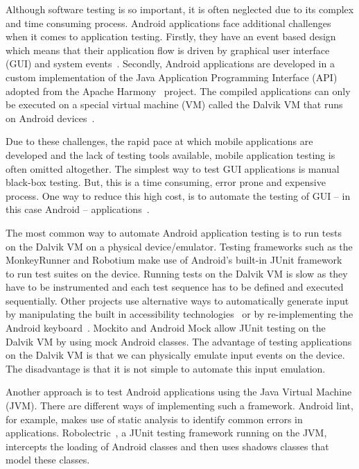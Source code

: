 \documentclass{acm_proc_article-sp}
\begin{document}
Although software testing is so important, it is often neglected due to its complex and time consuming process. Android
applications face additional challenges when it comes to application testing. Firstly, they have an event based design which means that
their application flow is driven by graphical user interface (GUI) and system events~\cite{Hu:2011}. Secondly, Android applications are
developed in a
custom implementation of the Java Application Programming Interface (API)  adopted from the Apache Harmony~\cite{harmony} project. The
compiled applications can only be executed on a special virtual machine (VM) called the Dalvik VM that runs on Android
devices~\cite{dalvik}.

Due to these challenges, the rapid pace at which mobile applications are developed and the lack of testing tools available, mobile
application testing is often omitted altogether. The simplest way to test GUI applications is manual black-box testing.
But, this is a time consuming, error prone and expensive~\cite{AccessibilityTech} process. One way to reduce this high cost, is to  automate
the testing of GUI -- in this case Android -- applications~\cite{AccessibilityTech}.

The most common way to automate Android application testing is to run tests on the Dalvik VM on a
physical device/emulator. Testing frameworks such as the MonkeyRunner and Robotium make use of Android's built-in JUnit
framework~\cite{TestingAndroid} to run test suites on the device. Running tests on the Dalvik VM is slow as they have to be instrumented and
each test sequence has to be defined and executed sequentially. Other projects use alternative ways to automatically generate input by
manipulating the built in accessibility technologies~\cite{AccessibilityTech} or by re-implementing the Android
keyboard~\cite{KeyboardModel}. Mockito and Android Mock allow JUnit testing on the Dalvik VM by using mock Android classes. The advantage of
testing applications on the Dalvik VM is that we can physically emulate input events on the device. The disadvantage is that it is not
simple to automate this input emulation. 

Another approach is to test Android applications using the Java Virtual Machine (JVM). There are different ways of implementing such
a framework. Android lint, for example, makes use of static analysis to identify common errors in applications.
Robolectric~\cite{robolectric}, a JUnit testing framework running on the JVM,  intercepts the loading of Android classes and then uses
shadows classes that model these classes.
\end{document}

